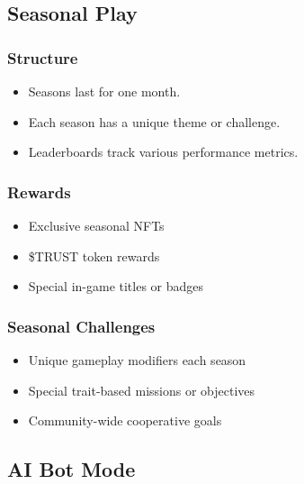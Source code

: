 \documentclass[]{article}
\begin{document}
\hypertarget{seasonal-play}{%
\subsection{Seasonal Play}\label{seasonal-play}}

\hypertarget{structure}{%
\subsubsection{Structure}\label{structure}}

\begin{itemize}
\tightlist
\item
  Seasons last for one month.
\item
  Each season has a unique theme or challenge.
\item
  Leaderboards track various performance metrics.
\end{itemize}

\hypertarget{rewards}{%
\subsubsection{Rewards}\label{rewards}}

\begin{itemize}
\tightlist
\item
  Exclusive seasonal NFTs
\item
  \$TRUST token rewards
\item
  Special in-game titles or badges
\end{itemize}

\hypertarget{seasonal-challenges}{%
\subsubsection{Seasonal Challenges}\label{seasonal-challenges}}

\begin{itemize}
\tightlist
\item
  Unique gameplay modifiers each season
\item
  Special trait-based missions or objectives
\item
  Community-wide cooperative goals
\end{itemize}

\hypertarget{ai-bot-mode}{%
\subsection{AI Bot Mode}\label{ai-bot-mode}}
\end{document}
